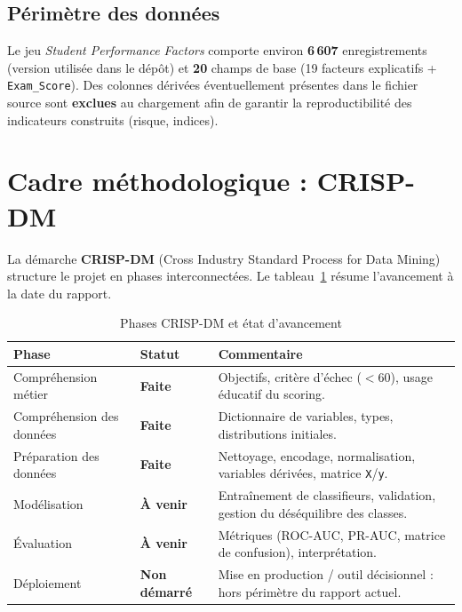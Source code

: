 \documentclass[a4paper,11pt]{article}
\begin{document}
\subsection{Périmètre des données}
Le jeu \textit{Student Performance Factors} comporte environ \textbf{6\,607} enregistrements (version utilisée dans le dépôt) et \textbf{20} champs de base (19 facteurs explicatifs + \texttt{Exam\_Score}). Des colonnes dérivées éventuellement présentes dans le fichier source sont \textbf{exclues} au chargement afin de garantir la reproductibilité des indicateurs construits (risque, indices).

\section{Cadre méthodologique : CRISP-DM}

La démarche \textbf{CRISP-DM} (Cross Industry Standard Process for Data Mining) structure le projet en phases interconnectées. Le tableau~\ref{tab:crispdm} résume l'avancement à la date du rapport.

\begin{table}[htbp]
  \centering
  \caption{Phases CRISP-DM et état d'avancement}
  \label{tab:crispdm}
  \begin{tabular}{@{}p{4.2cm}p{2.2cm}p{7.5cm}@{}}
    \toprule
    \textbf{Phase} & \textbf{Statut} & \textbf{Commentaire} \\
    \midrule
    Compréhension métier & \textbf{Faite} & Objectifs, critère d'échec ($<60$), usage éducatif du scoring. \\
    Compréhension des données & \textbf{Faite} & Dictionnaire de variables, types, distributions initiales. \\
    Préparation des données & \textbf{Faite} & Nettoyage, encodage, normalisation, variables dérivées, matrice \texttt{X}/\texttt{y}. \\
    Modélisation & \textbf{À venir} & Entraînement de classifieurs, validation, gestion du déséquilibre des classes. \\
    Évaluation & \textbf{À venir} & Métriques (ROC-AUC, PR-AUC, matrice de confusion), interprétation. \\
    Déploiement & \textbf{Non démarré} & Mise en production / outil décisionnel : hors périmètre du rapport actuel. \\
    \bottomrule
  \end{tabular}
\end{table}
\end{document}
